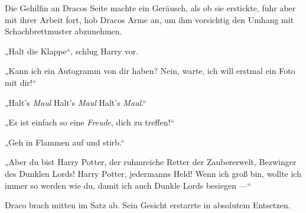 Die Gehilfin an Dracos Seite machte ein Geräusch, als ob sie erstickte, fuhr aber mit ihrer Arbeit fort, hob Dracos Arme an, um ihm vorsichtig den Umhang mit Schachbrettmuster abzunehmen.

„Halt die Klappe“, schlug Harry vor.

„Kann ich ein Autogramm von dir haben? Nein, warte, ich will erstmal ein Foto mit dir!“

„Halt’s \emph{Maul} Halt’s \emph{Maul} Halt’s \emph{Maul}.“

„Es ist einfach so eine \emph{Freude}, dich zu treffen!“

„Geh in Flammen auf und stirb.“

„Aber du bist Harry Potter, der ruhmreiche Retter der Zaubererwelt, Bezwinger des Dunklen Lords! Harry Potter, jedermanns Held! Wenn ich groß bin, wollte ich immer so werden wie du, damit ich auch Dunkle Lords besiegen —“

Draco brach mitten im Satz ab. Sein Gesicht erstarrte in absolutem Entsetzen.

